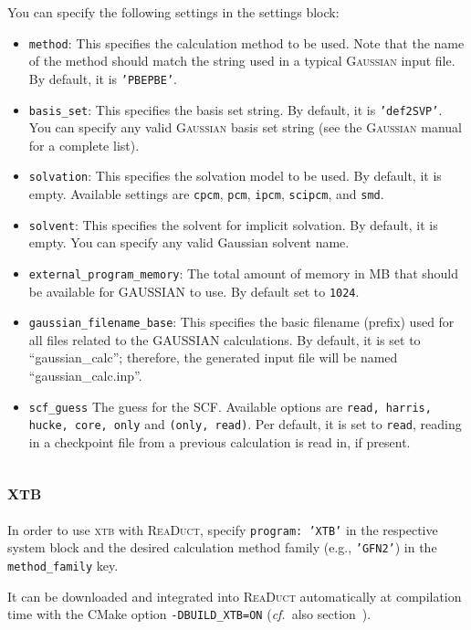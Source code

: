 \documentclass[]{tufte-book}
\begin{document}
You can specify the following settings in the settings block:
\begin{itemize}
\item \texttt{method}:
This specifies the calculation method to be used.
Note that the name of the method should match the string used in a typical \textsc{Gaussian} input file.
By default, it is \texttt{'PBEPBE'}.
\item \texttt{basis\_set}: This specifies the basis set string. By default, it is \texttt{'def2SVP'}. You can specify
any valid \textsc{Gaussian} basis set string (see the \textsc{Gaussian} manual for a complete list).
\item \texttt{solvation}: This specifies the solvation model to be used. By default, it is empty. Available settings are \texttt{cpcm}, \texttt{pcm}, \texttt{ipcm}, \texttt{scipcm},
and \texttt{smd}.
\item \texttt{solvent}: This specifies the solvent for implicit solvation. By default, it is empty. You can specify any valid Gaussian solvent name.
\item \texttt{external\_program\_memory}: The total amount of memory in MB that should be available for GAUSSIAN to use.
By default set to \texttt{1024}.
\item \texttt{gaussian\_filename\_base}: This specifies the basic filename (prefix) used for all files related to the GAUSSIAN calculations.
By default, it is set to ``gaussian\_calc''; therefore, the generated input file will be named ``gaussian\_calc.inp''.
\item \texttt{scf\_guess} The guess for the SCF. Available options are \texttt{read, harris, hucke, core, only} and \texttt{(only, read)}. Per default, it is set to \texttt{read}, reading in a checkpoint file from a previous calculation is read in, if present.
\end{itemize}

\subsection{\textsc{xtb}}

In order to use \textsc{xtb} with \textsc{ReaDuct}, specify \texttt{program: 'XTB'} in the respective system block and the desired
calculation method family (e.g., \texttt{'GFN2'}) in the \texttt{method\_family} key.

It can be downloaded and integrated into \textsc{ReaDuct} automatically at compilation time with the CMake option \texttt{-DBUILD\_XTB=ON} (\textit{cf.}~also section~).
\end{document}
